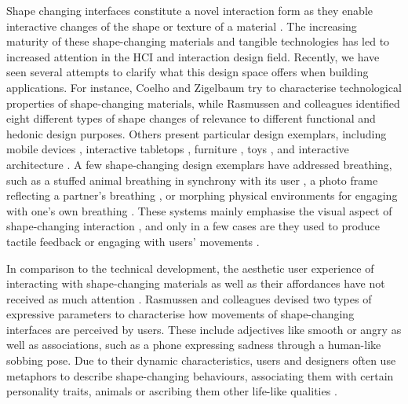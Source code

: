 Shape changing interfaces constitute a novel interaction form as they enable interactive changes of the shape or texture of a material \cite{alexander_grand_2018}. The increasing maturity of these shape-changing materials and tangible technologies has led to increased attention in the HCI and interaction design field. Recently, we have seen several attempts to clarify what this design space offers when building applications. For instance, Coelho and Zigelbaum \cite{coelho_shape-changing_2011} try to characterise technological properties of shape-changing materials, while Rasmussen and colleagues \cite{rasmussen_shape-changing_2012} identified eight different types of shape changes of relevance to different functional and hedonic design purposes. Others present particular design exemplars, including mobile devices \cite{hemmert_shape-changing_2010, dimitriadis_evaluating_2014, gomes_morephone_2013}, interactive tabletops \cite{follmer_inform_2013, taher_exploring_2015}, furniture \cite{gronvall_causing_2014}, toys \cite{katsumoto_ninja_2013}, and interactive architecture \cite{oosterhuis_interactions_2008}. A few shape-changing design exemplars have addressed breathing, such as a stuffed animal breathing in synchrony with its user \cite{aslan_hold_2016}, a photo frame  reflecting a partner's breathing \cite{kim_breathingframe_2015}, or morphing physical environments for engaging with one's own breathing \cite{sjoman_breathing_2018, schnadelbach_exobuilding:_2012}. These systems mainly emphasise the visual aspect of shape-changing interaction \cite{kim_breathingframe_2015, sjoman_breathing_2018, schnadelbach_exobuilding_2012, moran_exopranayama_2016}, and only in a few cases are they used to produce tactile feedback \cite{yu_breathe_2015} or engaging with users' movements \cite{tomimatsu_breathing_2016}.

In comparison to the technical development, the aesthetic user experience of interacting with shape-changing materials as well as their affordances have not received as much attention \cite{rasmussen_shape-changing_2012, alexander_grand_2018}. Rasmussen and colleagues \cite{rasmussen_shape-changing_2012} devised two types of expressive parameters to characterise how movements of shape-changing interfaces are perceived by users. These include adjectives like smooth or angry as well as associations, such as a phone expressing sadness through a human-like sobbing pose. Due to their dynamic characteristics, users and designers often use metaphors to describe shape-changing behaviours, associating them with certain personality traits, animals or ascribing them other life-like qualities \cite{rasmussen_sketching_2016, kwak_design_2014}.


